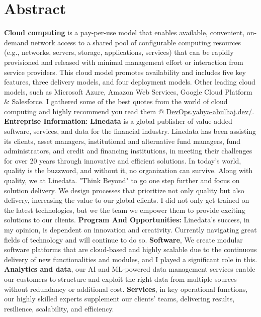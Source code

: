 \chapter*{Abstract}
\newline


\textbf{Cloud computing} is a pay-per-use model that enables available, convenient, on-demand network access to a shared pool of configurable computing resources (e.g., networks, servers, storage, applications, services) that can be rapidly provisioned and released with minimal management effort or interaction from service providers. This cloud model promotes availability and includes five key features, three delivery models, and four deployment models. Other leading cloud models, such as Microsoft Azure, Amazon Web Services, Google Cloud Platform & Salesforce.
I gathered some of the best quotes from the world of cloud computing and highly recommend you read them @ \href{https://devops.yahya-abulhaj.dev/}{DevOps.yahya-abulhaj.dev/}. 
\newline \newline
\newline \textbf{Entreprise Information:}\newline 
\textbf{Linedata} is a global publisher of value-added software, services, and data for the financial industry. Linedata has been assisting its clients, asset managers, institutional and alternative fund managers, fund administrators, and credit and financing institutions, in meeting their challenges for over 20 years through innovative and efficient solutions.
In today's world, quality is the buzzword, and without it, no organization can survive. Along with quality, we at Linedata. "Think Beyond" to go one step further and focus on solution delivery. We design processes that prioritize not only quality but also delivery, increasing the value to our global clients. I did not only get trained  on the latest technologies, but we the team we empower them to provide exciting solutions to our clients.
\newline \newline
\newline \textbf{Program And Opportunities:}\newline 
Linedata's success, in my opinion, is dependent on innovation and creativity. Currently navigating great fields of technology and will continue to do so.\newline 
\textbf{Software}, We create modular software platforms that are cloud-based and highly scalable due to the continuous delivery of new functionalities and modules, and I played a significant role in this.\newline 
\textbf{Analytics and data}, our AI and ML-powered data management services enable our customers to structure and exploit the right data from multiple sources without redundancy or additional cost.\newline 
\textbf{Services}, in key operational functions, our highly skilled experts supplement our clients' teams, delivering results, resilience, scalability, and efficiency.


